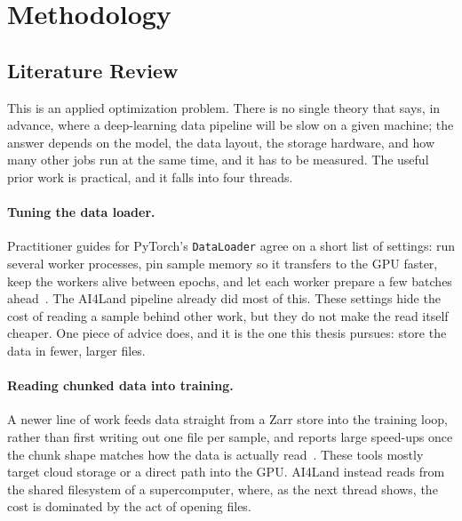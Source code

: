 \documentclass[12pt,a4paper]{article}
\begin{document}
\section{Methodology}\label{sec:methodology}

\subsection{Literature Review}

This is an applied optimization problem. There is no single theory that says, in advance, where
a deep-learning data pipeline will be slow on a given machine; the answer depends on the model,
the data layout, the storage hardware, and how many other jobs run at the same time, and it has
to be measured. The useful prior work is practical, and it falls into four threads.

\paragraph{Tuning the data loader.} Practitioner guides for PyTorch's \texttt{DataLoader} agree
on a short list of settings: run several worker processes, pin sample memory so it transfers to
the GPU faster, keep the workers alive between epochs, and let each worker prepare a few batches
ahead~\cite{pytorch_lightning_speed,modexa_dataloader,progressive_robot_dataloader}. The AI4Land
pipeline already did most of this. These settings hide the cost of reading a sample behind other
work, but they do not make the read itself cheaper. One piece of advice does, and it is the one
this thesis pursues: store the data in fewer, larger files.

\paragraph{Reading chunked data into training.} A newer line of work feeds data straight from a
Zarr store into the training loop, rather than first writing out one file per sample, and reports
large speed-ups once the chunk shape matches how the data is actually
read~\cite{earthmover_dataloader,xarray_gpu_pipeline}. These tools mostly target cloud storage or
a direct path into the GPU. AI4Land instead reads from the shared filesystem of a supercomputer,
where, as the next thread shows, the cost is dominated by the act of opening files.
\end{document}
